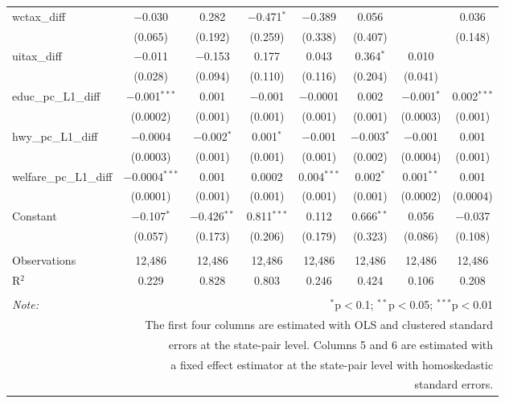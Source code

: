 \begin{table}[!htbp]
\begin{tabular}{@{\extracolsep{5pt}}lccccccc}
  wctax\_diff & $-$0.030 & 0.282 & $-$0.471$^{*}$ & $-$0.389 & 0.056 &  & 0.036 \\ 
  & (0.065) & (0.192) & (0.259) & (0.338) & (0.407) &  & (0.148) \\ 
  uitax\_diff & $-$0.011 & $-$0.153 & 0.177 & 0.043 & 0.364$^{*}$ & 0.010 &  \\ 
  & (0.028) & (0.094) & (0.110) & (0.116) & (0.204) & (0.041) &  \\ 
  educ\_pc\_L1\_diff & $-$0.001$^{***}$ & 0.001 & $-$0.001 & $-$0.0001 & 0.002 & $-$0.001$^{*}$ & 0.002$^{***}$ \\ 
  & (0.0002) & (0.001) & (0.001) & (0.001) & (0.001) & (0.0003) & (0.001) \\ 
  hwy\_pc\_L1\_diff & $-$0.0004 & $-$0.002$^{*}$ & 0.001$^{*}$ & $-$0.001 & $-$0.003$^{*}$ & $-$0.001 & 0.001 \\ 
  & (0.0003) & (0.001) & (0.001) & (0.001) & (0.002) & (0.0004) & (0.001) \\ 
  welfare\_pc\_L1\_diff & $-$0.0004$^{***}$ & 0.001 & 0.0002 & 0.004$^{***}$ & 0.002$^{*}$ & 0.001$^{**}$ & 0.001 \\ 
  & (0.0001) & (0.001) & (0.001) & (0.001) & (0.001) & (0.0002) & (0.0004) \\ 
  Constant & $-$0.107$^{*}$ & $-$0.426$^{**}$ & 0.811$^{***}$ & 0.112 & 0.666$^{**}$ & 0.056 & $-$0.037 \\ 
  & (0.057) & (0.173) & (0.206) & (0.179) & (0.323) & (0.086) & (0.108) \\ 
 \hline \\[-1.8ex] 
Observations & 12,486 & 12,486 & 12,486 & 12,486 & 12,486 & 12,486 & 12,486 \\ 
R$^{2}$ & 0.229 & 0.828 & 0.803 & 0.246 & 0.424 & 0.106 & 0.208 \\ 
\hline 
\hline \\[-1.8ex] 
\textit{Note:}  & \multicolumn{7}{r}{$^{*}$p$<$0.1; $^{**}$p$<$0.05; $^{***}$p$<$0.01} \\ 
 & \multicolumn{7}{r}{The first four columns are estimated with OLS and clustered standard} \\ 
 & \multicolumn{7}{r}{ errors at the state-pair level. Columns 5 and 6 are estimated with} \\ 
 & \multicolumn{7}{r}{a fixed effect estimator at the state-pair level with homoskedastic} \\ 
 & \multicolumn{7}{r}{standard errors.} \\ 
\end{tabular} 
\end{table} 
